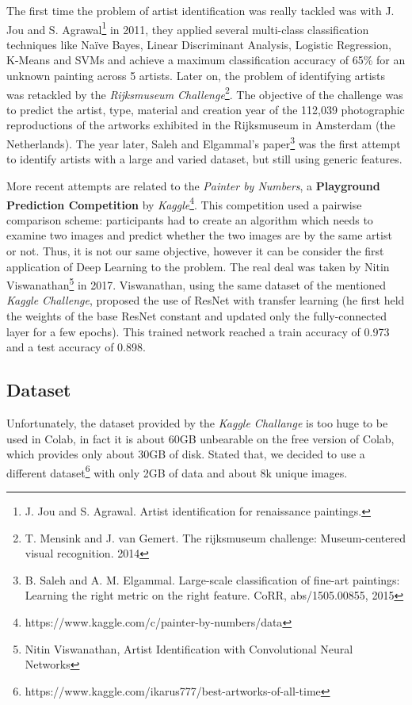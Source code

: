 The first time the problem of artist identification was really tackled was with J. Jou and S. Agrawal\footnote{J. Jou and S. Agrawal. Artist identification for renaissance paintings.} in 2011, they applied several multi-class classification techniques like Naïve Bayes, Linear Discriminant Analysis, Logistic Regression, K-Means and SVMs and achieve a maximum classification accuracy of 65\% for an unknown painting across 5 artists. 
Later on, the problem of identifying artists was retackled by the \textit{Rijksmuseum Challenge}\footnote{T. Mensink and J. van Gemert. The rijksmuseum challenge: Museum-centered visual recognition. 2014}. The objective of the challenge was to predict the artist, type, material and creation year of the 112,039 photographic reproductions of the artworks exhibited in the Rijksmuseum in Amsterdam (the Netherlands). The year later, Saleh and Elgammal's paper\footnote{B. Saleh and A. M. Elgammal. Large-scale classification of fine-art paintings: Learning the right metric on the right
feature. CoRR, abs/1505.00855, 2015} was the first attempt to identify artists with a large and varied dataset, but still using generic features.

More recent attempts are related to the \textit{Painter by Numbers}, a \textbf{Playground Prediction Competition} by \textit{Kaggle}\footnote{https://www.kaggle.com/c/painter-by-numbers/data}. This competition used a pairwise comparison scheme: participants had to create an algorithm which needs to examine two images and predict whether the two images are by the same artist or not. Thus, it is not our same objective, however it can be consider the first application of Deep Learning to the problem. The real deal was taken by Nitin Viswanathan\footnote{Nitin Viswanathan, Artist Identification with Convolutional Neural Networks} in 2017.
Viswanathan, using the same dataset of the mentioned \textit{Kaggle Challenge}, proposed the use of ResNet with transfer learning (he first held the weights of the base ResNet constant and updated only the fully-connected layer for a few epochs). This trained network reached a train accuracy of 0.973 and a test accuracy of 0.898.



\subsection{Dataset}
Unfortunately, the dataset provided by the \textit{Kaggle Challange} is too huge to be used in Colab, in fact it is about 60GB unbearable on the free version of Colab, which provides only about 30GB of disk. Stated that, we decided to use a different dataset\footnote{https://www.kaggle.com/ikarus777/best-artworks-of-all-time} with only 2GB of data and about 8k unique images.

